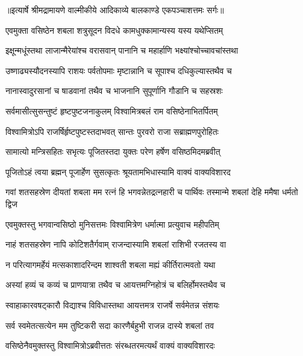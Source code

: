 {॥इत्यार्षे श्रीमद्रामायणे वाल्मीकीये आदिकाव्ये बालकाण्डे एकपञ्चाशत्तमः सर्गः॥}


\twolineshloka
{एवमुक्ता वसिष्ठेन शबला शत्रुसूदन}
{विदधे कामधुक्कामान्यस्य यस्य यथेप्सितम्} %

\twolineshloka
{इक्षून्मधूंस्तथा लाजान्मैरेयांश्च वरासवान्}
{पानानि च महार्हाणि भक्ष्यांश्चोच्चावचांस्तथा} %

\twolineshloka
{उष्णाढ्यस्यौदनस्यापि राशयः पर्वतोपमाः}
{मृष्टान्नानि च सूपाश्च दधिकुल्यास्तथैव च} %

\twolineshloka
{नानास्वादुरसानां च षाडवानां तथैव च}
{भाजनानि सुपूर्णानि गौडानि च सहस्रशः} %

\twolineshloka
{सर्वमासीत्सुसन्तुष्टं हृष्टपुष्टजनाकुलम्}
{विश्वामित्रबलं राम वसिष्ठेनाभितर्पितम्} %

\twolineshloka
{विश्वामित्रोऽपि राजर्षिर्हृष्टपुष्टस्तदाभवत्}
{सान्तः पुरवरो राजा सब्राह्मणपुरोहितः} %

\twolineshloka
{सामात्यो मन्त्रिसहितः सभृत्यः पूजितस्तदा}
{युक्तः परेण हर्षेण वसिष्ठमिदमब्रवीत्} %

\twolineshloka
{पूजितोऽहं त्वया ब्रह्मन् पूजार्हेण सुसत्कृतः}
{श्रूयतामभिधास्यामि वाक्यं वाक्यविशारद} %

\threelineshloka
{गवां शतसहस्रेण दीयतां शबला मम}
{रत्नं हि भगवन्नेतद्रत्नहारी च पार्थिवः}
{तस्मान्मे शबलां देहि ममैषा धर्मतो द्विज} %

\twolineshloka
{एवमुक्तस्तु भगवान्वसिष्ठो मुनिसत्तमः}
{विश्वामित्रेण धर्मात्मा प्रत्युवाच महीपतिम्} %

\twolineshloka
{नाहं शतसहस्रेण नापि कोटिशतैर्गवाम्}
{राजन्दास्यामि शबलां राशिभी रजतस्य वा} %

\twolineshloka
{न परित्यागमर्हेयं मत्सकाशादरिन्दम}
{शाश्वती शबला मह्यं कीर्तिरात्मवतो यथा} %

\twolineshloka
{अस्यां हव्यं च कव्यं च प्राणयात्रा तथैव च}
{आयत्तमग्निहोत्रं च बलिर्होमस्तथैव च} %

\twolineshloka
{स्वाहाकारवषट्कारौ विद्याश्च विविधास्तथा}
{आयत्तमत्र राजर्षे सर्वमेतन्न संशयः} %

\twolineshloka
{सर्व स्वमेतत्सत्येन मम तुष्टिकरी सदा}
{कारणैर्बहुभी राजन्न दास्ये शबलां तव} %

\twolineshloka
{वसिष्ठेनैवमुक्तस्तु विश्वामित्रोऽब्रवीत्ततः}
{संरब्धतरमत्यर्थं वाक्यं वाक्यविशारदः} %

